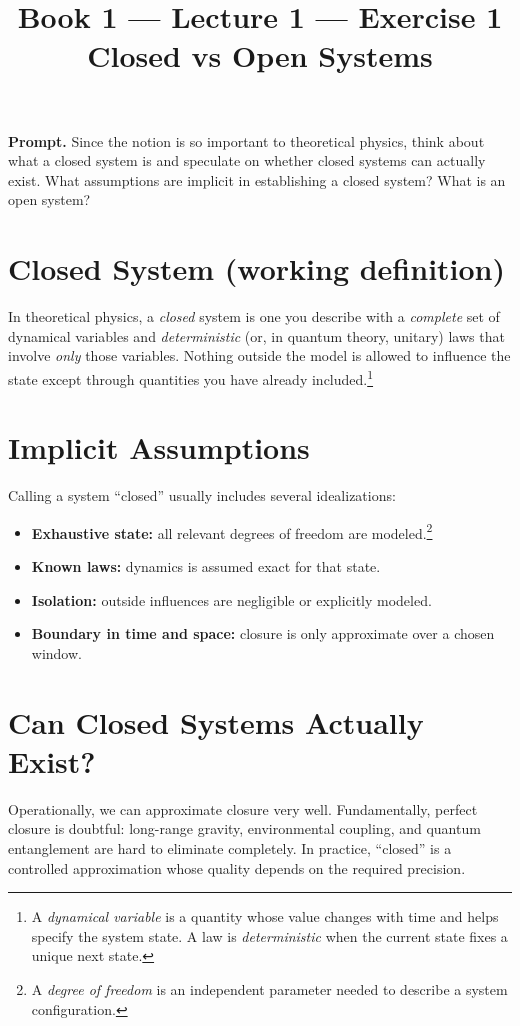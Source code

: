 \documentclass[11pt]{article}
\title{\textbf{Book 1 --- Lecture 1 --- Exercise 1}\\[2mm]
\large Closed vs Open Systems}
\author{}
\date{}
\newcommand{\promptbox}[1]{%
  \begingroup\setlength{\fboxsep}{10pt}\noindent
  \colorbox{blue!8}{\parbox{\dimexpr\linewidth-2\fboxsep\relax}{\textbf{Prompt. }#1}}
  \endgroup
}
\begin{document}
\maketitle

\promptbox{Since the notion is so important to theoretical physics, think about
what a closed system is and speculate on whether closed systems can actually
exist. What assumptions are implicit in establishing a closed system? What is an
open system?}

\section*{Closed System (working definition)}
In theoretical physics, a \emph{closed} system is one you describe with a
\emph{complete} set of dynamical variables and \emph{deterministic} (or, in
quantum theory, unitary) laws that involve \emph{only} those variables.
Nothing outside the model is allowed to influence the state except through
quantities you have already included.\footnote{A \emph{dynamical variable} is a
quantity whose value changes with time and helps specify the system state. A law
is \emph{deterministic} when the current state fixes a unique next state.}

\section*{Implicit Assumptions}
Calling a system ``closed'' usually includes several idealizations:
\begin{itemize}
  \item \textbf{Exhaustive state:} all relevant degrees of freedom are modeled.\footnote{A
  \emph{degree of freedom} is an independent parameter needed to describe a
  system configuration.}
  \item \textbf{Known laws:} dynamics is assumed exact for that state.
  \item \textbf{Isolation:} outside influences are negligible or explicitly modeled.
  \item \textbf{Boundary in time and space:} closure is only approximate over a chosen window.
\end{itemize}

\section*{Can Closed Systems Actually Exist?}
Operationally, we can approximate closure very well. Fundamentally, perfect
closure is doubtful: long-range gravity, environmental coupling, and quantum
entanglement are hard to eliminate completely. In practice, ``closed'' is a
controlled approximation whose quality depends on the required precision.
\end{document}
